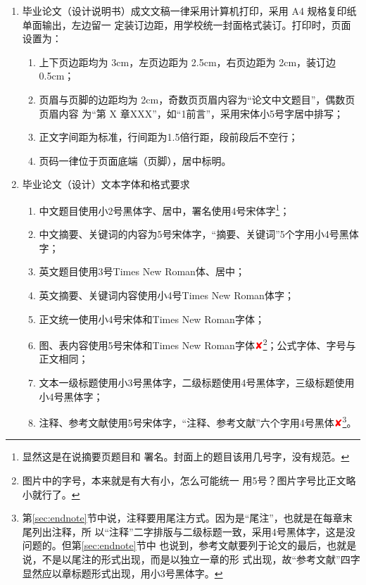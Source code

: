 \documentclass{swfuthesis}
\begin{document}
\begin{enumerate}
\item 毕业论文（设计说明书）成文文稿一律采用计算机打印，采用 A4 规格复印纸单面输出，左边留一
  定装订边距，用学校统一封面格式装订。打印时，页面设置为：
  \begin{enumerate}
  \item 上下页边距均为 3cm，左页边距为 2.5cm，右页边距为 2cm，装订边 0.5cm；
  \item 页眉与页脚的边距均为 2cm，奇数页页眉内容为“论文中文题目”，偶数页页眉内容
    为“第 X 章\hspace{1ex}XXX”，如“1\hspace{1ex}前言”，采用宋体小5号字居中排写；
  \item 正文字间距为标准，行间距为1.5倍行距，段前段后不空行；
  \item 页码一律位于页面底端（页脚），居中标明。
  \end{enumerate}
\item 毕业论文（设计）文本字体和格式要求
  \begin{enumerate}
  \item 中文题目使用小2号黑体字、居中，署名使用4号宋体字\footnote{显然这是在说摘要页题目和
      署名。封面上的题目该用几号字，没有规范。}；
  \item 中文摘要、关键词的内容为5号宋体字，“摘要、关键词”5个字用小4号黑体字；
  \item 英文题目使用3号Times New Roman体、居中；
  \item 英文摘要、关键词内容使用小4号Times New Roman体字；
  \item 正文统一使用小4号宋体和Times New Roman字体；
  \item 图、表内容使用5号宋体和Times New Roman字体{\textcolor{red}{✘}}\footnote{图片中的字号，本来就是有大有小，怎么可能统一
      用5号？图片字号比正文略小就行了。}；公式字体、字号与正文相同；
  \item 文本一级标题使用小3号黑体字，二级标题使用4号黑体字，三级标题使用小4号黑体字；
  \item 注释、参考文献使用5号宋体字，“注释、参考文献”六个字用4号黑体{\textcolor{red}{✘}}\footnote{
      第\ref{sec:endnote}节中说，注释要用尾注方式。因为是“尾注”，也就是在每章末尾列出注释，所
      以“注释”二字排版与二级标题一致，采用4号黑体字，这是没问题的。但第\ref{sec:endnote}节中
      也说到，参考文献要列于论文的最后，也就是说，不是以尾注的形式出现，而是以独立一章的形
      式出现，故“参考文献”四字显然应以章标题形式出现，用小3号黑体字。}。
  \end{enumerate}
\end{enumerate}
\end{document}
